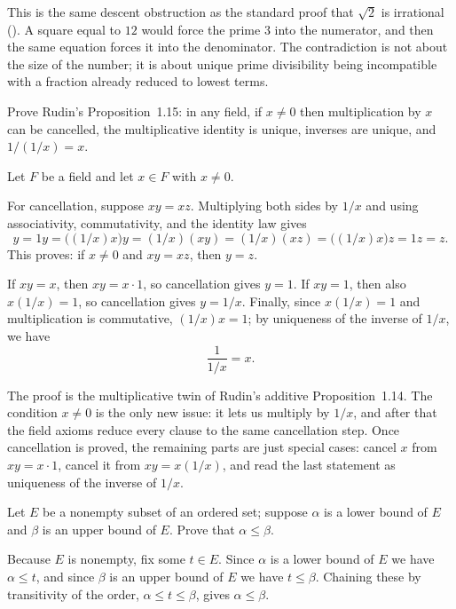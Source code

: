 \documentclass[main.tex]{subfiles}
\begin{document}
\begin{Reflection}
This is the same descent obstruction as the standard proof that $\sqrt2$ is irrational
(). A square equal to $12$ would force the prime $3$ into the numerator, and then the
same equation forces it into the denominator. The contradiction is not about the size of the number;
it is about unique prime divisibility being incompatible with a fraction already reduced to lowest
terms.
\end{Reflection}

Prove Rudin's Proposition~1.15: in any field, if $x\neq 0$ then multiplication by $x$ can be
cancelled, the multiplicative identity is unique, inverses are unique, and $1/(1/x)=x$.

\begin{SolutionBlue}
Let $F$ be a field and let $x\in F$ with $x\neq 0$.

For cancellation, suppose $xy=xz$. Multiplying both sides by $1/x$ and using associativity,
commutativity, and the identity law gives
\[
y=1y=\bigl((1/x)x\bigr)y=(1/x)(xy)=(1/x)(xz)=\bigl((1/x)x\bigr)z=1z=z.
\]
This proves: if $x\neq 0$ and $xy=xz$, then $y=z$.

If $xy=x$, then $xy=x\cdot 1$, so cancellation gives $y=1$. If $xy=1$, then also
$x(1/x)=1$, so cancellation gives $y=1/x$. Finally, since $x(1/x)=1$ and multiplication is
commutative, $(1/x)x=1$; by uniqueness of the inverse of $1/x$, we have
\[
\frac{1}{1/x}=x.
\]
\end{SolutionBlue}

\begin{Reflection}
The proof is the multiplicative twin of Rudin's additive Proposition~1.14. The condition $x\neq 0$ is
the only new issue: it lets us multiply by $1/x$, and after that the field axioms reduce every clause
to the same cancellation step. Once cancellation is proved, the remaining parts are just special
cases: cancel $x$ from $xy=x\cdot 1$, cancel it from $xy=x(1/x)$, and read the last statement as
uniqueness of the inverse of $1/x$.
\end{Reflection}

Let $E$ be a nonempty subset of an ordered set; suppose $\alpha$ is a lower bound of $E$ and $\beta$
is an upper bound of $E$. Prove that $\alpha\le\beta$.

\begin{Solution}
Because $E$ is nonempty, fix some $t\in E$. Since $\alpha$ is a lower bound of $E$ we have
$\alpha\le t$, and since $\beta$ is an upper bound of $E$ we have $t\le\beta$. Chaining these by
transitivity of the order, $\alpha\le t\le\beta$, gives $\alpha\le\beta$.
\end{Solution}
\end{document}
